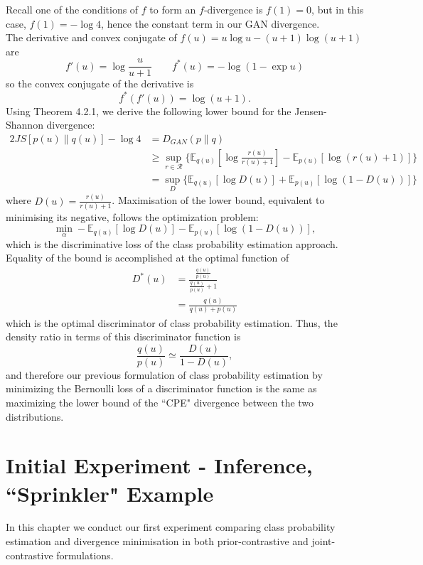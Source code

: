\documentclass[honours,12pt]{unswthesis}
\newcommand{\E}{\mathbb{E}}
\numberwithin{equation}{section}
\theoremstyle{definition}
\begin{document}
Recall one of the conditions of $f$ to form an $f$-divergence is $f(1)=0$, but in this case, $f(1)=-\log 4$, hence the constant term in our GAN divergence.\\
The derivative and convex conjugate of $f(u)=u\log u-(u+1)\log (u+1)$ are
\[f'(u)=\log \frac{u}{u+1}\qquad f^*(u)=-\log (1-\exp u)\]
so the convex conjugate of the derivative is
\[f^*(f'(u))=\log (u+1).\]
Using Theorem 4.2.1, we derive the following lower bound for the Jensen-Shannon divergence:
\begin{align*}
2JS[p(u)\|q(u)]-\log 4&=D_{GAN}(p\|q)\\
&\geq \sup_{r\in \mathcal{R}}\{\mathbb{E}_{q(u)}\left[\log \frac{r(u)}{r(u)+1}\right]-\mathbb{E}_{p(u)}[\log(r(u)+1)]\}\\
&=\sup_{D}\{\E_{q(u)}[\log D(u)]+\E_{p(u)}[\log(1-D(u))]\}
\end{align*}
where $D(u)=\frac{r(u)}{r(u)+1}$. Maximisation of the lower bound, equivalent to minimising its negative, follows the optimization problem:
\[\min_\alpha -\E_{q(u)}[\log D(u)]-\E_{p(u)}[\log (1-D(u))],\]
which is the discriminative loss of the class probability estimation approach. Equality of the bound is accomplished at the optimal function of
\begin{align*}
D^*(u)&=\frac{\frac{q(u)}{p(u)}}{\frac{q(u)}{p(u)}+1}\\
&=\frac{q(u)}{q(u)+p(u)}
\end{align*}
which is the optimal discriminator of class probability estimation. Thus, the density ratio in terms of this discriminator function is 
\[\frac{q(u)}{p(u)}\simeq \frac{D(u)}{1-D(u)},\]
and therefore our previous formulation of class probability estimation by minimizing the Bernoulli loss of a discriminator function is the same as maximizing the lower bound of the ``CPE" divergence between the two distributions.
\chapter{Initial Experiment - Inference, ``Sprinkler" Example}
In this chapter we conduct our first experiment comparing class probability estimation and divergence minimisation in both prior-contrastive and joint-contrastive formulations.
\end{document}
